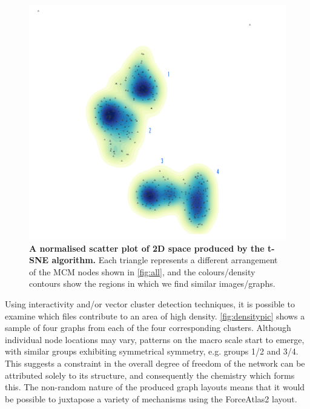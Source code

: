     \begin{figure}[H]
         \centering
    \includegraphics[width=.6\textwidth]{figures_c1/beijingtest/density.png}
     \caption{\textbf{A normalised scatter plot of 2D space produced by the t-SNE algorithm.} Each triangle represents a different arrangement of the MCM nodes shown in \autoref{fig:all}, and the colours/density contours show the regions in which we find similar images/graphs. }
     \label{fig:densty}
     \end{figure}

Using interactivity and/or vector cluster detection techniques, it is possible to examine which files contribute to an area of high density. \autoref{fig:densitypic} shows a sample of four graphs from each of the four corresponding clusters. Although individual node locations may vary, patterns on the macro scale start to emerge, with similar groups exhibiting symmetrical symmetry, e.g. groups 1/2 and 3/4. This suggests a constraint in the overall degree of freedom of the network can be attributed solely to its structure, and consequently the chemistry which forms this. The non-random nature of the produced graph layouts means that it would be possible to juxtapose a variety of mechanisms using the ForceAtlas2 layout.


